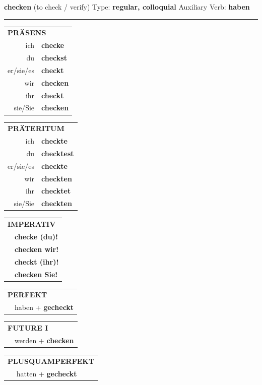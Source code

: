 \documentclass[10pt,a4paper]{revtex4-2}
\begin{document}
\begin{verbbox}
{\Large \bf checken} (to check / verify) \hfill Type: \textbf{regular, colloquial} \hfill Auxiliary Verb: \textbf{haben}

\vspace{5pt}
\hrule
\vspace{5pt}

\begin{tabular}{rl}
\multicolumn{2}{l}{\textbf{PRÄSENS}}\\
ich & \textbf{checke}\\
du & \textbf{checkst}\\
er/sie/es & \textbf{checkt}\\
wir & \textbf{checken}\\
ihr & \textbf{checkt}\\
sie/Sie & \textbf{checken}\\
\end{tabular}
\hfill
\begin{tabular}{rl}
\multicolumn{2}{l}{\textbf{PRÄTERITUM}}\\
ich & \textbf{checkte}\\
du & \textbf{checktest}\\
er/sie/es & \textbf{checkte}\\
wir & \textbf{checkten}\\
ihr & \textbf{checktet}\\
sie/Sie & \textbf{checkten}\\
\end{tabular}
\hfill
\begin{tabular}{rl}
\multicolumn{2}{l}{\textbf{IMPERATIV}}\\
& \textbf{checke (du)!}\\
& \textbf{checken wir!}\\
& \textbf{checkt (ihr)!}\\
& \textbf{checken Sie!}\\
\end{tabular}

\vspace{10pt}

\begin{tabular}{rl}
\multicolumn{2}{l}{\textbf{PERFEKT}}\\
& haben + \textbf{gecheckt}\\
\end{tabular}
\hfill
\begin{tabular}{rl}
\multicolumn{2}{l}{\textbf{FUTURE I}}\\
& werden + \textbf{checken}\\
\end{tabular}
\hfill
\begin{tabular}{rl}
\multicolumn{2}{l}{\textbf{PLUSQUAMPERFEKT}}\\
& hatten + \textbf{gecheckt}\\
\end{tabular}


\end{verbbox}
\end{document}
